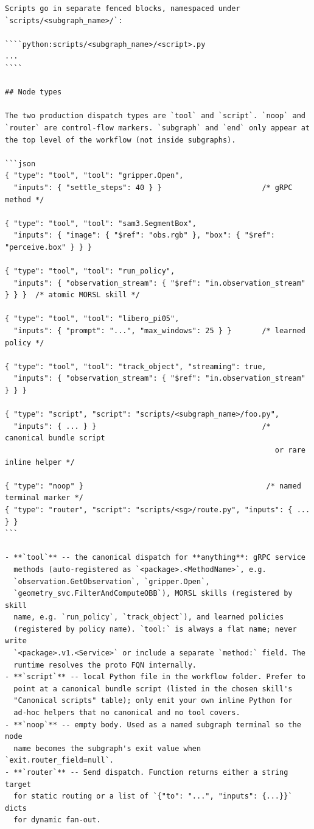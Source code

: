 \begin{lstlisting}
Scripts go in separate fenced blocks, namespaced under
`scripts/<subgraph_name>/`:

````python:scripts/<subgraph_name>/<script>.py
...
````

## Node types

The two production dispatch types are `tool` and `script`. `noop` and
`router` are control-flow markers. `subgraph` and `end` only appear at
the top level of the workflow (not inside subgraphs).

```json
{ "type": "tool", "tool": "gripper.Open",
  "inputs": { "settle_steps": 40 } }                       /* gRPC method */

{ "type": "tool", "tool": "sam3.SegmentBox",
  "inputs": { "image": { "$ref": "obs.rgb" }, "box": { "$ref": "perceive.box" } } }

{ "type": "tool", "tool": "run_policy",
  "inputs": { "observation_stream": { "$ref": "in.observation_stream" } } }  /* atomic MORSL skill */

{ "type": "tool", "tool": "libero_pi05",
  "inputs": { "prompt": "...", "max_windows": 25 } }       /* learned policy */

{ "type": "tool", "tool": "track_object", "streaming": true,
  "inputs": { "observation_stream": { "$ref": "in.observation_stream" } } }

{ "type": "script", "script": "scripts/<subgraph_name>/foo.py",
  "inputs": { ... } }                                      /* canonical bundle script
                                                              or rare inline helper */

{ "type": "noop" }                                          /* named terminal marker */
{ "type": "router", "script": "scripts/<sg>/route.py", "inputs": { ... } }
```

- **`tool`** -- the canonical dispatch for **anything**: gRPC service
  methods (auto-registered as `<package>.<MethodName>`, e.g.
  `observation.GetObservation`, `gripper.Open`,
  `geometry_svc.FilterAndComputeOBB`), MORSL skills (registered by skill
  name, e.g. `run_policy`, `track_object`), and learned policies
  (registered by policy name). `tool:` is always a flat name; never write
  `<package>.v1.<Service>` or include a separate `method:` field. The
  runtime resolves the proto FQN internally.
- **`script`** -- local Python file in the workflow folder. Prefer to
  point at a canonical bundle script (listed in the chosen skill's
  "Canonical scripts" table); only emit your own inline Python for
  ad-hoc helpers that no canonical and no tool covers.
- **`noop`** -- empty body. Used as a named subgraph terminal so the node
  name becomes the subgraph's exit value when `exit.router_field=null`.
- **`router`** -- Send dispatch. Function returns either a string target
  for static routing or a list of `{"to": "...", "inputs": {...}}` dicts
  for dynamic fan-out.


\end{lstlisting}
